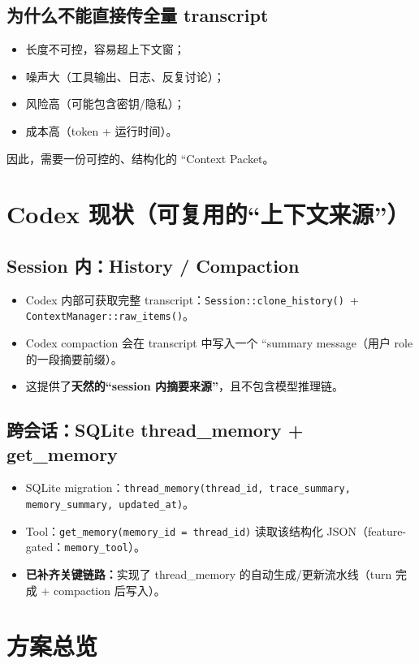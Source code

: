 \documentclass[UTF8,11pt]{ctexart}
\begin{document}
\subsection{为什么不能直接传全量 transcript}
\begin{itemize}[nosep]
  \item 长度不可控，容易超上下文窗；
  \item 噪声大（工具输出、日志、反复讨论）；
  \item 风险高（可能包含密钥/隐私）；
  \item 成本高（token + 运行时间）。
\end{itemize}
因此，需要一份可控的、结构化的 ``Context Packet。

\section{Codex 现状（可复用的“上下文来源”）}
\subsection{Session 内：History / Compaction}
\begin{itemize}[nosep]
  \item Codex 内部可获取完整 transcript：\texttt{Session::clone\_history()}\, + \texttt{ContextManager::raw\_items()}。
  \item Codex compaction 会在 transcript 中写入一个 ``summary message（用户 role 的一段摘要前缀）。
  \item 这提供了\textbf{天然的“session 内摘要来源”}，且不包含模型推理链。
\end{itemize}

\subsection{跨会话：SQLite thread\_memory + get\_memory}
\begin{itemize}[nosep]
  \item SQLite migration：\texttt{thread\_memory(thread\_id, trace\_summary, memory\_summary, updated\_at)}。
  \item Tool：\texttt{get\_memory(memory\_id = thread\_id)} 读取该结构化 JSON（feature-gated：\texttt{memory\_tool}）。
  \item \textbf{已补齐关键链路：}实现了 thread\_memory 的自动生成/更新流水线（turn 完成 + compaction 后写入）。
\end{itemize}

\section{方案总览}
\end{document}
